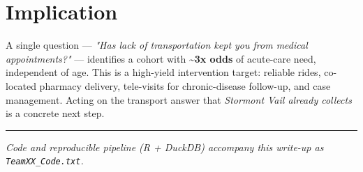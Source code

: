 \documentclass[9pt]{article}
\begin{document}
\section*{\textcolor{accent}{Implication}}
A single question --- \textit{"Has lack of transportation kept you from medical appointments?"} --- identifies a cohort with \textbf{\textasciitilde{}3x odds} of acute-care need, independent of age. This is a high-yield intervention target: reliable rides, co-located pharmacy delivery, tele-visits for chronic-disease follow-up, and case management. Acting on the transport answer that \textit{Stormont Vail already collects} is a concrete next step.

\vspace{0.08em}
\hrule
\vspace{0.08em}
\footnotesize \textit{Code and reproducible pipeline (R + DuckDB) accompany this write-up as \texttt{TeamXX\_Code.txt}.}
\end{document}
